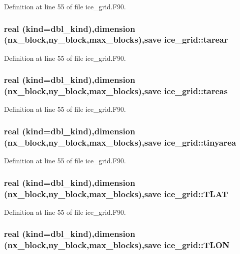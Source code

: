 Definition at line 55 of file ice\_\-grid.F90.\hypertarget{namespaceice__grid_ab853acbf3fa50d832ffed201f760ef88}{
\subsubsection[{tarear}]{\setlength{\rightskip}{0pt plus 5cm}real (kind=dbl\_\-kind),dimension (nx\_\-block,ny\_\-block,max\_\-blocks),save {\bf ice\_\-grid::tarear}}}
\label{namespaceice__grid_ab853acbf3fa50d832ffed201f760ef88}


Definition at line 55 of file ice\_\-grid.F90.\hypertarget{namespaceice__grid_ad08766f36b378acddead7f3503d7be19}{
\subsubsection[{tareas}]{\setlength{\rightskip}{0pt plus 5cm}real (kind=dbl\_\-kind),dimension (nx\_\-block,ny\_\-block,max\_\-blocks),save {\bf ice\_\-grid::tareas}}}
\label{namespaceice__grid_ad08766f36b378acddead7f3503d7be19}


Definition at line 55 of file ice\_\-grid.F90.\hypertarget{namespaceice__grid_a24fc3cf53e5e2c356bd8e4110112f39c}{
\subsubsection[{tinyarea}]{\setlength{\rightskip}{0pt plus 5cm}real (kind=dbl\_\-kind),dimension (nx\_\-block,ny\_\-block,max\_\-blocks),save {\bf ice\_\-grid::tinyarea}}}
\label{namespaceice__grid_a24fc3cf53e5e2c356bd8e4110112f39c}


Definition at line 55 of file ice\_\-grid.F90.\hypertarget{namespaceice__grid_a76fff4cfe2a27c44abe9fd445f806f25}{
\subsubsection[{TLAT}]{\setlength{\rightskip}{0pt plus 5cm}real (kind=dbl\_\-kind),dimension (nx\_\-block,ny\_\-block,max\_\-blocks),save {\bf ice\_\-grid::TLAT}}}
\label{namespaceice__grid_a76fff4cfe2a27c44abe9fd445f806f25}


Definition at line 55 of file ice\_\-grid.F90.\hypertarget{namespaceice__grid_a2b90fd0fa35a54c0313dac995f929ee7}{
\subsubsection[{TLON}]{\setlength{\rightskip}{0pt plus 5cm}real (kind=dbl\_\-kind),dimension (nx\_\-block,ny\_\-block,max\_\-blocks),save {\bf ice\_\-grid::TLON}}}
\label{namespaceice__grid_a2b90fd0fa35a54c0313dac995f929ee7}


